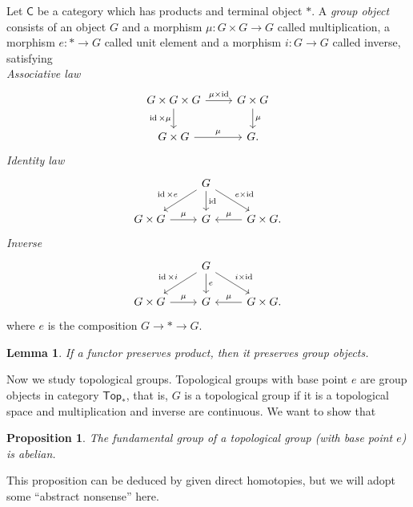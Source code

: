\documentclass[a4paper]{amsart}
\theoremstyle{plain}
\newtheorem{prop}[thm]{Proposition}
\newtheorem{lem}[thm]{Lemma}
\theoremstyle{definition}
\theoremstyle{remark}
\begin{document}
Let $\mathsf{C}$ be a category which has products and terminal object $*$.
A \emph{group object} consists of an object $G$ and a morphism $\mu:G\times G\to G$ called multiplication, a morphism $e:*\to G$ called unit element and a morphism $i:G\to G$ called inverse, satisfying\\
\emph{Associative law}
\[\begin{tikzcd}
    G\times G\times G \ar[r, "{\mu\times\operatorname{id}}"] \ar[d, "{\operatorname{id}\times\mu}"'] & G\times G \ar[d, "\mu"] \\
    G\times G \ar[r, "\mu"] & G.
\end{tikzcd}\]
\noindent\emph{Identity law}
\[\begin{tikzcd}
     & G \ar[dl, "\operatorname{id}\times e"'] \ar[d, "\operatorname{id}"] \ar[dr, "{e\times\operatorname{id}}"] & \\
    G\times G \ar[r, "\mu"] & G & G\times G. \ar[l, "\mu"']
\end{tikzcd}\]
\noindent\emph{Inverse}
\[\begin{tikzcd}
    & G \ar[dl, "\operatorname{id}\times i"'] \ar[d, "e"] \ar[dr, "{i\times\operatorname{id}}"] & \\
    G\times G \ar[r, "\mu"] & G & G\times G. \ar[l, "\mu"']
\end{tikzcd}\]
where $e$ is the composition $G\to * \to G$.

\begin{lem}
    If a functor preserves product, then it preserves group objects.
\end{lem}

Now we study topological groups.
Topological groups with base point $e$ are group objects in category $\mathsf{Top}_*$, that is, $G$ is a topological group if it is a topological space and multiplication and inverse are continuous.
We want to show that
\begin{prop}\label{top group}
    The fundamental group of a topological group (with base point $e$) is abelian.
\end{prop}

This proposition can be deduced by given direct homotopies, but we will adopt some ``abstract nonsense'' here.
\end{document}
